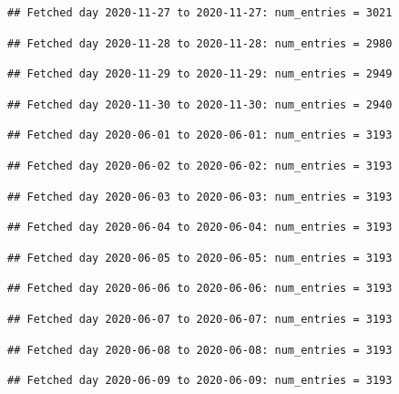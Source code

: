 \documentclass[]{article}
\begin{document}
\begin{verbatim}
## Fetched day 2020-11-27 to 2020-11-27: num_entries = 3021
\end{verbatim}

\begin{verbatim}
## Fetched day 2020-11-28 to 2020-11-28: num_entries = 2980
\end{verbatim}

\begin{verbatim}
## Fetched day 2020-11-29 to 2020-11-29: num_entries = 2949
\end{verbatim}

\begin{verbatim}
## Fetched day 2020-11-30 to 2020-11-30: num_entries = 2940
\end{verbatim}

\begin{verbatim}
## Fetched day 2020-06-01 to 2020-06-01: num_entries = 3193
\end{verbatim}

\begin{verbatim}
## Fetched day 2020-06-02 to 2020-06-02: num_entries = 3193
\end{verbatim}

\begin{verbatim}
## Fetched day 2020-06-03 to 2020-06-03: num_entries = 3193
\end{verbatim}

\begin{verbatim}
## Fetched day 2020-06-04 to 2020-06-04: num_entries = 3193
\end{verbatim}

\begin{verbatim}
## Fetched day 2020-06-05 to 2020-06-05: num_entries = 3193
\end{verbatim}

\begin{verbatim}
## Fetched day 2020-06-06 to 2020-06-06: num_entries = 3193
\end{verbatim}

\begin{verbatim}
## Fetched day 2020-06-07 to 2020-06-07: num_entries = 3193
\end{verbatim}

\begin{verbatim}
## Fetched day 2020-06-08 to 2020-06-08: num_entries = 3193
\end{verbatim}

\begin{verbatim}
## Fetched day 2020-06-09 to 2020-06-09: num_entries = 3193
\end{verbatim}
\end{document}
